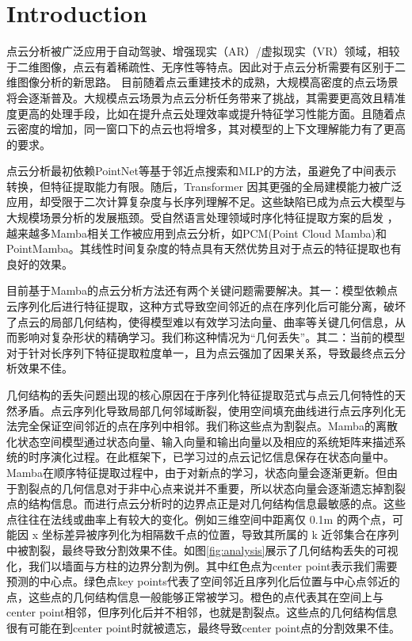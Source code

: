 \documentclass[preprint,12pt]{elsarticle}
\begin{document}

\section{Introduction}
\label{sec1}
点云分析被广泛应用于自动驾驶、增强现实（AR）/虚拟现实（VR）领域，相较于二维图像，点云有着稀疏性、无序性等特点。因此对于点云分析需要有区别于二维图像分析的新思路。
目前随着点云重建技术的成熟，大规模高密度的点云场景将会逐渐普及。大规模点云场景为点云分析任务带来了挑战\cite{Vertex}，其需要更高效且精准度更高的处理手段，比如在提升点云处理效率或提升特征学习性能方面。且随着点云密度的增加，同一窗口下的点云也将增多，其对模型的上下文理解能力有了更高的要求。

点云分析最初依赖PointNet\cite{pointnet,PointNet++}等基于邻近点搜索和MLP的方法，虽避免了中间表示转换，但特征提取能力有限。随后，Transformer\cite{pt,ptv3,superpoint} 因其更强的全局建模能力被广泛应用，却受限于二次计算复杂度与长序列理解不足。这些缺陷已成为点云大模型与大规模场景分析的发展瓶颈。受自然语言处理领域时序化特征提取方案的启发 \cite{ssm,Mamba,Lstm}，越来越多Mamba\cite{Mamba,VisionMamba}相关工作被应用到点云分析，如PCM(Point Cloud Mamba)\cite{pcm}和PointMamba\cite{PointMamba}。其线性时间复杂度的特点具有天然优势且对于点云的特征提取也有良好的效果。

目前基于Mamba的点云分析方法还有两个关键问题需要解决。其一：模型依赖点云序列化后进行特征提取，这种方式导致空间邻近的点在序列化后可能分离，破坏了点云的局部几何结构，使得模型难以有效学习法向量、曲率等关键几何信息，从而影响对复杂形状的精确学习。我们称这种情况为“几何丢失”。其二：当前的模型对于针对长序列下特征提取粒度单一，且为点云强加了因果关系，导致最终点云分析效果不佳。

几何结构的丢失问题出现的核心原因在于序列化特征提取范式与点云几何特性的天然矛盾。点云序列化导致局部几何邻域断裂，使用空间填充曲线进行点云序列化无法完全保证空间邻近的点在序列中相邻。我们称这些点为割裂点。Mamba的离散化状态空间模型通过状态向量、输入向量和输出向量以及相应的系统矩阵来描述系统的时序演化过程。在此框架下，已学习过的点云记忆信息保存在状态向量中。Mamba在顺序特征提取过程中，由于对新点的学习，状态向量会逐渐更新。但由于割裂点的几何信息对于非中心点来说并不重要，所以状态向量会逐渐遗忘掉割裂点的结构信息。而进行点云分析时的边界点正是对几何结构信息最敏感的点。这些点往往在法线或曲率上有较大的变化。例如三维空间中距离仅 0.1m 的两个点，可能因 x 坐标差异被序列化为相隔数千点的位置，导致其所属的 k 近邻集合在序列中被割裂，最终导致分割效果不佳。如图\cref{fig:analysis}展示了几何结构丢失的可视化，我们以墙面与方柱的边界分割为例。其中红色点为center point表示我们需要预测的中心点。绿色点key points代表了空间邻近且序列化后位置与中心点邻近的点，这些点的几何结构信息一般能够正常被学习。橙色的点代表其在空间上与center point相邻，但序列化后并不相邻，也就是割裂点。这些点的几何结构信息很有可能在到center point时就被遗忘，最终导致center point点的分割效果不佳。
\end{document}
